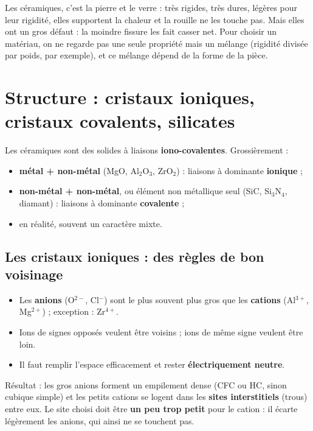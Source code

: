 
\begin{goatbox}
Les céramiques, c'est la pierre et le verre : très rigides, très dures, légères pour leur
rigidité, elles supportent la chaleur et la rouille ne les touche pas. Mais elles ont un gros
défaut : la moindre fissure les fait casser net. Pour choisir un matériau, on ne regarde pas
une seule propriété mais un mélange (rigidité divisée par poids, par exemple), et ce mélange
dépend de la forme de la pièce.
\end{goatbox}

\section{Structure : cristaux ioniques, cristaux covalents, silicates}

Les céramiques sont des solides à liaisons \textbf{iono-covalentes}. Grossièrement :
\begin{itemize}
  \item \textbf{métal + non-métal} (MgO, Al$_2$O$_3$, ZrO$_2$) : liaisons à dominante
        \textbf{ionique} ;
  \item \textbf{non-métal + non-métal}, ou élément non métallique seul (SiC, Si$_3$N$_4$,
        diamant) : liaisons à dominante \textbf{covalente} ;
  \item en réalité, souvent un caractère mixte.
\end{itemize}

\subsection*{Les cristaux ioniques : des règles de bon voisinage}

\begin{propbox}[title=Comment s'arrangent les ions]
\begin{itemize}
  \item Les \textbf{anions} (O$^{2-}$, Cl$^-$) sont le plus souvent plus gros que les
        \textbf{cations} (Al$^{3+}$, Mg$^{2+}$) ; exception : Zr$^{4+}$.
  \item Ions de signes opposés veulent être voisins ; ions de même signe veulent être loin.
  \item Il faut remplir l'espace efficacement et rester \textbf{électriquement neutre}.
\end{itemize}
Résultat : les gros anions forment un empilement dense (CFC ou HC, sinon cubique simple) et
les petits cations se logent dans les \textbf{sites interstitiels} (trous) entre eux. Le site
choisi doit être \textbf{un peu trop petit} pour le cation : il écarte légèrement les anions,
qui ainsi \og ne se touchent pas\fg{}.
\end{propbox}

